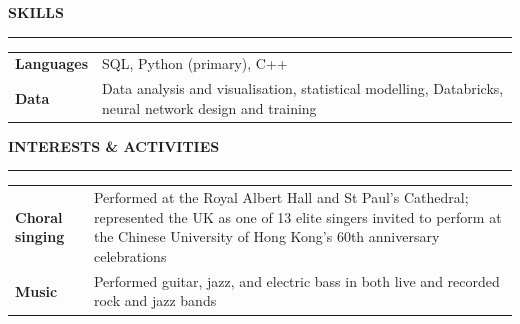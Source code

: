 \documentclass[11pt, a4paper]{article}
\newcommand{\cvsection}[1]{%
  \vspace{7pt}%
  {\small\bfseries\color{navy}\MakeUppercase{#1}}\par%
  \nopagebreak\vspace{-8pt}%
  {\color{navy}\rule{\linewidth}{0.4pt}}\par%
  \vspace{3pt}%
}
\begin{document}
\cvsection{Skills}

\vspace{1pt}
\begin{tabularx}{\textwidth}{@{}lX@{}}
  \textbf{Languages}  & SQL, Python (primary), C++ \\[2pt]
  \textbf{Data}       & Data analysis and visualisation, statistical modelling, Databricks,
                        neural network design and training \\
\end{tabularx}

\cvsection{Interests \& Activities}

\vspace{1pt}
\begin{tabularx}{\textwidth}{@{}lX@{}}
  \textbf{Choral singing} & Performed at the Royal Albert Hall and St Paul's Cathedral;
                            represented the UK as one of 13 elite singers invited to perform
                            at the Chinese University of Hong Kong's 60th anniversary
                            celebrations \\
  \textbf{Music}          & Performed guitar, jazz, and electric bass in both live and recorded rock and jazz bands \\
\end{tabularx}
\end{document}
